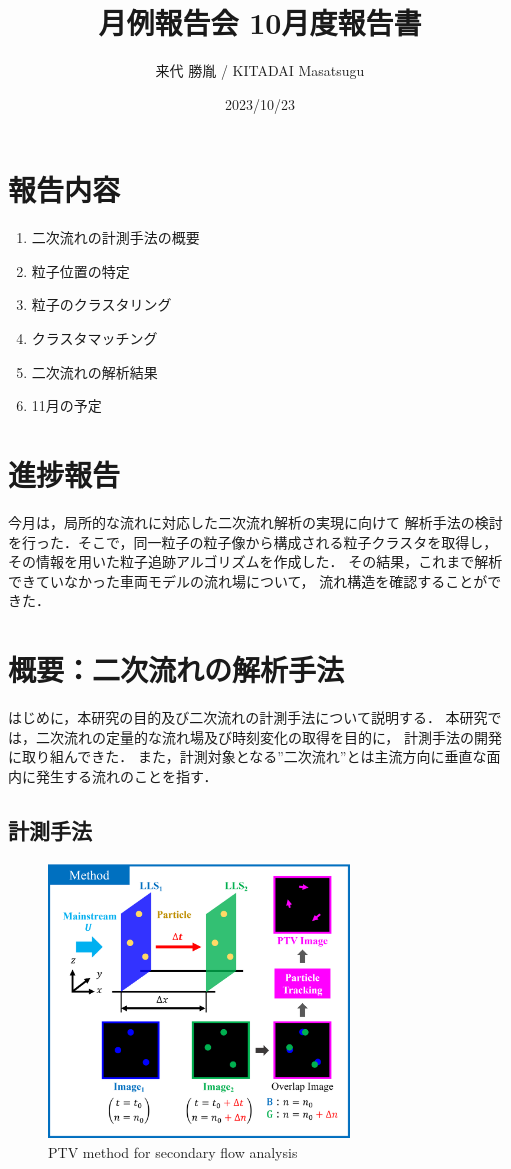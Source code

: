 \documentclass[twocolumn,a4j]{jsarticle}
\author{来代 勝胤 / KITADAI Masatsugu}
\title{月例報告会 10月度報告書}
\date{2023/10/23}
\begin{document}
\columnseprule=0.1mm
\maketitle

\section*{報告内容}
\begin{enumerate}[1.]
	\item 二次流れの計測手法の概要
	\item 粒子位置の特定
	\item 粒子のクラスタリング
	\item クラスタマッチング
	\item 二次流れの解析結果
	\item 11月の予定
\end{enumerate}

\section*{進捗報告}
今月は，局所的な流れに対応した二次流れ解析の実現に向けて
解析手法の検討を行った．そこで，同一粒子の粒子像から構成される粒子クラスタを取得し，
その情報を用いた粒子追跡アルゴリズムを作成した．
その結果，これまで解析できていなかった車両モデルの流れ場について，
流れ構造を確認することができた．

\section{概要：二次流れの解析手法}
はじめに，本研究の目的及び二次流れの計測手法について説明する．
本研究では，二次流れの定量的な流れ場及び時刻変化の取得を目的に，
計測手法の開発に取り組んできた．
また，計測対象となる”二次流れ”とは主流方向に垂直な面内に発生する流れのことを指す．

\subsection{計測手法}
\begin{figure}[htbp]
	\centering
	\includegraphics[keepaspectratio, width=80mm]{../images/method.png}
	\caption{PTV method for secondary flow analysis}
\end{figure}
\end{document}
